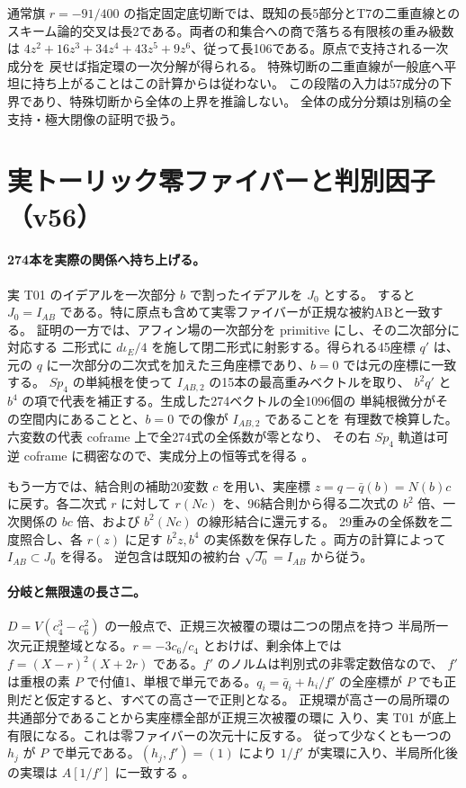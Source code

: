 \documentclass[11pt,a4paper]{ltjsarticle}
\theoremstyle{remark}
\begin{document}
通常旗 $r=-91/400$ の指定固定底切断では、既知の長5部分とT7の二重直線との
スキーム論的交叉は長2である。両者の和集合への商で落ちる有限核の重み級数は
$4z^2+16z^3+34z^4+43z^5+9z^6$、従って長106である。原点で支持される一次成分を
戻せば指定環の一次分解が得られる\cite{t7-primary-v55}。
特殊切断の二重直線が一般底へ平坦に持ち上がることはこの計算からは従わない。
この段階の入力は57成分の下界であり、特殊切断から全体の上界を推論しない。
全体の成分分類は別稿の全支持・極大閉像の証明で扱う。

\section{実トーリック零ファイバーと判別因子（v56）}
\paragraph{274本を実際の関係へ持ち上げる。}
実 T01 のイデアルを一次部分 $b$ で割ったイデアルを $J_0$ とする。
すると $J_0=I_{AB}$ である。特に原点も含めて実零ファイバーが正規な被約ABと一致する。
証明の一方では、アフィン場の一次部分を primitive にし、その二次部分に対応する
二形式に $d\iota_E/4$ を施して閉二形式に射影する。得られる45座標 $q'$ は、
元の $q$ に一次部分の二次式を加えた三角座標であり、$b=0$ では元の座標に一致する。
$Sp_4$ の単純根を使って $I_{AB,2}$ の15本の最高重みベクトルを取り、
$b^2q'$ と $b^4$ の項で代表を補正する。生成した274ベクトルの全1096個の
単純根微分がその空間内にあることと、$b=0$ での像が $I_{AB,2}$ であることを
有理数で検算した。六変数の代表 coframe 上で全274式の全係数が零となり、
その右 $Sp_4$ 軌道は可逆 coframe に稠密なので、実成分上の恒等式を得る
\cite{coframe-274-v56}。

もう一方では、結合則の補助20変数 $c$ を用い、実座標 $z=q-\bar q(b)=N(b)c$
に戻す。各二次式 $r$ に対して $r(Nc)$ を、96結合則から得る二次式の
$b^2$ 倍、一次関係の $bc$ 倍、および $b^2(Nc)$ の線形結合に還元する。
29重みの全係数を二度照合し、各 $r(z)$ に足す $b^2z,b^4$ の実係数を保存した
\cite{asso-274-v56}。両方の計算によって $I_{AB}\subset J_0$ を得る。
逆包含は既知の被約台 $\sqrt{J_0}=I_{AB}$ から従う。

\paragraph{分岐と無限遠の長さ二。}
$D=V(c_4^3-c_6^2)$ の一般点で、正規三次被覆の環は二つの閉点を持つ
半局所一次元正規整域となる。$r=-3c_6/c_4$ とおけば、剰余体上では
$f=(X-r)^2(X+2r)$ である。$f'$ のノルムは判別式の非零定数倍なので、
$f'$ は重根の素 $P$ で付値1、単根で単元である。$q_i=\bar q_i+h_i/f'$
の全座標が $P$ でも正則だと仮定すると、すべての高さ一で正則となる。
正規環が高さ一の局所環の共通部分であることから実座標全部が正規三次被覆の環に
入り、実 T01 が底上有限になる。これは零ファイバーの次元十に反する。
従って少なくとも一つの $h_j$ が $P$ で単元である。$(h_j,f')=(1)$ により
$1/f'$ が実環に入り、半局所化後の実環は $A[1/f']$ に一致する
\cite{toric-discriminant-v56,toric-disc-review-v56}。
\end{document}
